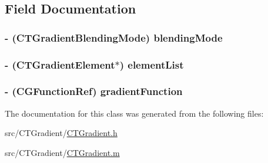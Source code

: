 \subsection{Field Documentation}
\hypertarget{interface_c_t_gradient_a127e94011d529bc38ad62c1d15da00d8}{
\subsubsection[{blending\-Mode}]{\setlength{\rightskip}{0pt plus 5cm}-\/ ({\bf C\-T\-Gradient\-Blending\-Mode}) blending\-Mode\hspace{0.3cm}{\ttfamily [protected]}}}\label{interface_c_t_gradient_a127e94011d529bc38ad62c1d15da00d8}
\hypertarget{interface_c_t_gradient_a8db6cbfa589be4e3099a9fcd6e058a21}{
\subsubsection[{element\-List}]{\setlength{\rightskip}{0pt plus 5cm}-\/ ({\bf C\-T\-Gradient\-Element}$\ast$) element\-List\hspace{0.3cm}{\ttfamily [protected]}}}\label{interface_c_t_gradient_a8db6cbfa589be4e3099a9fcd6e058a21}
\hypertarget{interface_c_t_gradient_aefa46bc529df92da17edb3a63a64c8eb}{
\subsubsection[{gradient\-Function}]{\setlength{\rightskip}{0pt plus 5cm}-\/ (C\-G\-Function\-Ref) gradient\-Function\hspace{0.3cm}{\ttfamily [protected]}}}\label{interface_c_t_gradient_aefa46bc529df92da17edb3a63a64c8eb}


The documentation for this class was generated from the following files\-:\begin{DoxyCompactItemize}
\item 
src/\-C\-T\-Gradient/\hyperlink{_c_t_gradient_8h}{C\-T\-Gradient.\-h}\item 
src/\-C\-T\-Gradient/\hyperlink{_c_t_gradient_8m}{C\-T\-Gradient.\-m}\end{DoxyCompactItemize}
